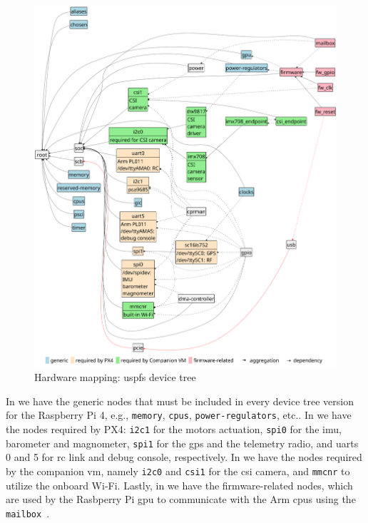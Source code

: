 \begin{figure}[!hbt]
  \centering
  \includegraphics[width=1.0\textwidth]{./img/pdf/hw-map-1} 
  \caption[Hardware mapping: USPFS device tree]{Hardware mapping: \gls{uspfs}
  device tree}%
  \label{fig:hw-map-1}
\end{figure}


In  we have the generic nodes that must be included in every device tree
version for the Raspberry Pi 4, e.g., \texttt{memory}, \texttt{cpus},
\texttt{power-regulators}, etc.. 
In  we have the nodes required by
PX4: \texttt{i2c1} for the motors actuation, \texttt{spi0} for the \gls{imu},
barometer and magnometer, \texttt{spi1} for the \gls{gps} and the telemetry
radio, and \glspl{uart} 0 and 5 for \gls{rc} link and debug console,
respectively.
In  we have the nodes required by the companion
\gls{vm}, namely \texttt{i2c0} and \texttt{csi1} for the \gls{csi} camera, and
\texttt{mmcnr} to utilize the onboard Wi-Fi.
Lastly, in  we have the firmware-related nodes,
which are used by the Rasbperry Pi \gls{gpu} to communicate with the Arm
\glspl{cpu} using the \texttt{mailbox}~\cite{rpi4-fw-mbox}.

